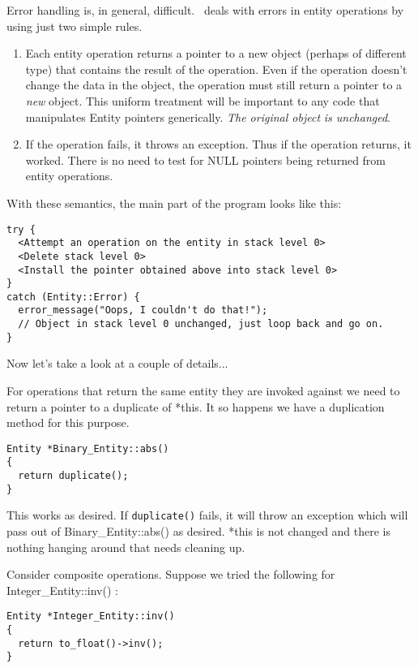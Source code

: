 \documentclass{report}
\begin{document}
Error handling is, in general, difficult. \CLAC\ deals with errors in entity operations by using
just two simple rules.

\begin{enumerate}
  
\item Each entity operation returns a pointer to a new object (perhaps of different type) that
  contains the result of the operation. Even if the operation doesn't change the data in the
  object, the operation must still return a pointer to a \emph{new} object. This uniform
  treatment will be important to any code that manipulates Entity pointers generically.
  \emph{The original object} \emph{is unchanged}.
  
\item If the operation fails, it throws an exception. Thus if the operation returns, it worked.
  There is no need to test for NULL pointers being returned from entity operations.

\end{enumerate}

With these semantics, the main part of the program looks like this:

\begin{verbatim}
try {
  <Attempt an operation on the entity in stack level 0>
  <Delete stack level 0>
  <Install the pointer obtained above into stack level 0>
}
catch (Entity::Error) {
  error_message("Oops, I couldn't do that!");
  // Object in stack level 0 unchanged, just loop back and go on.
}
\end{verbatim}

Now let's take a look at a couple of details...

For operations that return the same entity they are invoked against we need to return a pointer
to a duplicate of *this. It so happens we have a duplication method for this purpose.

\begin{verbatim}
Entity *Binary_Entity::abs()
{
  return duplicate();
}
\end{verbatim}

This works as desired. If \texttt{duplicate()} fails, it will throw an exception which will pass
out of Binary\_Entity::abs() as desired. *this is not changed and there is nothing hanging
around that needs cleaning up.

Consider composite operations. Suppose we tried the following for Integer\_Entity::inv() :

\begin{verbatim}
Entity *Integer_Entity::inv()
{
  return to_float()->inv();
}
\end{verbatim}
\end{document}
